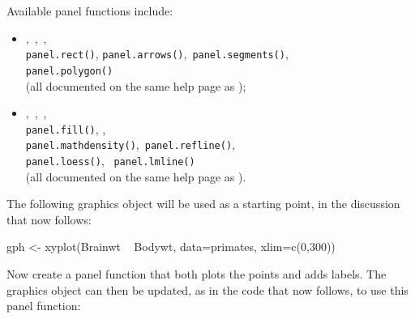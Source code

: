 Available panel functions include:
\begin{itemize}
\item {}
  ,\, ,\,
  ,\,\\  \verb!panel.rect()!,
  \verb!panel.arrows()!,\, \verb!panel.segments()!, \,\\
  \verb!panel.polygon()!\,\\ (all documented on the same help
  page as );
\item {},\, ,\,
, \,\\  \verb!panel.fill()!,
,\,\\  \verb!panel.mathdensity()!,\,
 \verb!panel.refline()!,\\
\verb!panel.loess()!, \, \verb!panel.lmline()!\\
(all
documented on the same help page as ).
\end{itemize}

The following graphics object  will be used as a starting
point, in the discussion that now follows:
\begin{Schunk}
\begin{Sinput}
gph <- xyplot(Brainwt ~ Bodywt,  data=primates,
              xlim=c(0,300))
\end{Sinput}
\end{Schunk}

Now create a panel function that both plots the points and adds
labels. The graphics object can then be updated, as in the code that
now follows, to use this panel function:

